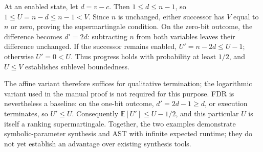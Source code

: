 At an enabled state, let $d=v-c$. Then $1\leq d\leq n-1$, so
$1\leq U=n-d\leq n-1<V$. Since $n$ is unchanged, either successor
has $V$ equal to $n$ or zero, proving the supermartingale condition.
On the zero-bit outcome, the difference becomes $d'=2d$: subtracting
$n$ from both variables leaves their difference unchanged. If the
successor remains enabled, $U'=n-2d\leq U-1$; otherwise $U'=0<U$.
Thus progress holds with probability at least $1/2$, and $U\leq V$
establishes sublevel boundedness.

The affine variant therefore suffices for qualitative termination; the
logarithmic variant used in the manual proof is not required for this
purpose. FDR is nevertheless a baseline: on the one-bit outcome,
$d'=2d-1\geq d$, or execution terminates, so $U'\leq U$.
Consequently $\mathbb{E}[U']\leq U-1/2$, and this particular $U$ is
itself a ranking supermartingale. Together, the two examples demonstrate
symbolic-parameter synthesis and AST with infinite expected runtime;
they do not yet establish an advantage over existing synthesis tools.

